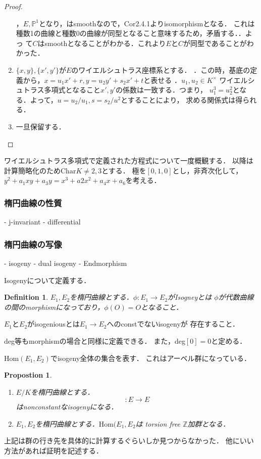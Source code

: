 \documentclass{ujarticle}
\newtheorem{dfn}[thm]{Definition}
\newtheorem{prop}[thm]{Propostion}
\begin{document}
\begin{proof}
\begin{enumerate}
    ，$E,\mathbb{P}^1$となり，はsmoothなので，Cor2.4.1よりisomorphismとなる．
    これは種数1の曲線と種数0の曲線が同型となること意味するため，矛盾する．．よっ
    て$C$はsmoothとなることがわかる．これより$E$と$C$が同型であることがわかった．
    \item $\{x,y \},\{x' , y' \}$が$E$のワイエルシュトラス座標系とする．
    ．この時，基底の定義から，$x = u_1x' +r ,y = u_2y' + s_2x' +t$と表せる
    ．$u_1,u_2 \in K^{\times}$
    ワイエルシュトラス多項式となること$x',y'$の係数は一致する．つまり，
    $u_1^3=u_2^2$となる．よって，$u=u_2/u_1,s=s_2/u^2$とすることにより，
    求める関係式は得られる．
    \item 一旦保留する．
  \end{enumerate}
\end{proof}

ワイエルシュトラス多項式で定義された方程式について一度概観する．
以降は計算簡略化のため$\mathrm{Char}K \neq 2,3$とする．
極を$[0,1,0]$とし，非斉次化して，
$ y^2 + a_1xy + a_3 y= x^3 + a2x^2 + a_4x + a_6$を考える．

\subsubsection{楕円曲線の性質}
\label{subs:楕円曲線の性質}

- j-invariant
- differential


\subsubsection{楕円曲線の写像}
\label{subs:isogeny}
- isogeny
- dual isogeny
- Endmorphism

Isogenyについて定義する．
\begin{dfn}
 $E_1,E_2$を楕円曲線とする．$\phi: E_1 \to E_2$がIsogneyとは
 $\phi$が代数曲線の間のmorphismになっており，$\phi(O)=O$となること．
\end{dfn}
$E_1$と$E_2$がisogeniousとは$E_1 \to E_2$へのconstでないisogenyが
存在すること．

deg等もmorphismの場合と同様に定義できる．
また，deg$[0]=0$と定める．

$\mathrm{Hom}(E_1,E_2)$でisogeny全体の集合を表す．
これはアーベル群になっている．

\begin{prop}
  \begin{enumerate}
    \item $E/K$を楕円曲線とする．
 \begin{equation*}
   [m]:E \to E
 \end{equation*}
 はnonconstantなisogenyになる．
    \item $E_1,E_2$を楕円曲線とする．$\mathrm{Hom}(E_1,E_2$は
    torsion free $\mathbb{Z}$加群となる．
  \end{enumerate}
\end{prop}
上記は群の行き先を具体的に計算するぐらいしか見つからなかった．
他にいい方法があれば証明を記述する．
\end{document}
